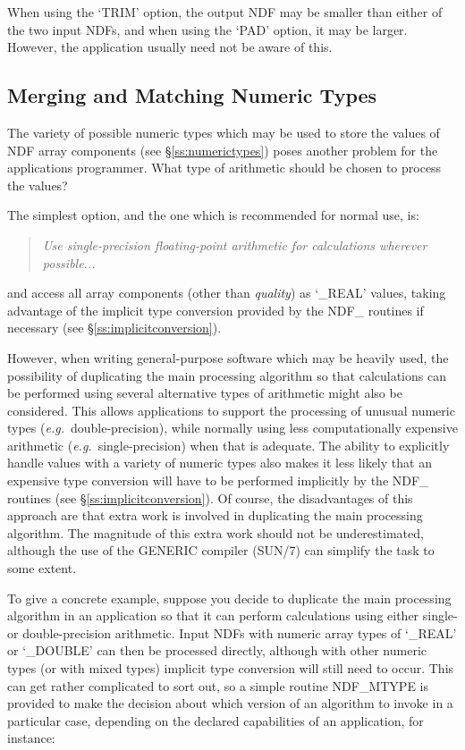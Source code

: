 \documentclass[twoside,11pt]{article}
\newcommand{\htmlref}[2]{#1}
\newcommand{\xref}[3]{#1}
\newcommand{\xlabel}[1]{}
\newcommand{\st}[1]{{\em{#1}}}
\begin{document}
When using the `TRIM' option, the output NDF may be smaller than either of
the two input NDFs, and when using the `PAD' option, it may be larger. 
However, the application usually need not be aware of this. 

\subsection{\xlabel{merging_and_matching_numeric_types}Merging and Matching Numeric Types}

The variety of possible numeric types which may be used to store the values
of NDF array components (see \S\ref{ss:numerictypes}) poses another problem
for the applications programmer. 
What type of arithmetic should be chosen to process the values?

The simplest option, and the one which is recommended for normal use, is:

\begin{quote}
\begin{center}
\st{Use single-precision floating-point arithmetic for calculations
wherever possible...} 
\end{center}
\end{quote}

and access all array components (other than \st{quality\/}) as `\_REAL'
values, taking advantage of the implicit type conversion provided by the
NDF\_ routines if necessary (see \S\ref{ss:implicitconversion}). 

However, when writing general-purpose software which may be heavily used,
the possibility of duplicating the main processing algorithm so that
calculations can be performed using several alternative types of arithmetic
might also be considered. 
This allows applications to support the processing of unusual numeric types
(\st{e.g.}\ double-precision), while normally using less computationally
expensive arithmetic (\st{e.g.}\ single-precision) when that is adequate. 
The ability to explicitly handle values with a variety of numeric types also
makes it less likely that an expensive type conversion will have to be
performed implicitly by the NDF\_ routines (see
\S\ref{ss:implicitconversion}). 
Of course, the disadvantages of this approach are that extra work is
involved in duplicating the main processing algorithm. 
The magnitude of this extra work should not be underestimated, although the
use of the GENERIC compiler (\xref{SUN/7}{sun7}{}) can simplify the
task to some extent.

To give a concrete example, suppose you decide to duplicate the main
processing algorithm in an application so that it can perform calculations
using either single- or double-precision arithmetic. 
Input NDFs with numeric array types of `\_REAL' or `\_DOUBLE' can then be
processed directly, although with other numeric types (or with mixed types)
implicit type conversion will still need to occur. 
This can get rather complicated to sort out, so a simple routine \htmlref{NDF\_MTYPE}{NDF_MTYPE}
is provided to make the decision about which version of an algorithm to
invoke in a particular case, depending on the declared capabilities of an
application, for instance:
\end{document}
